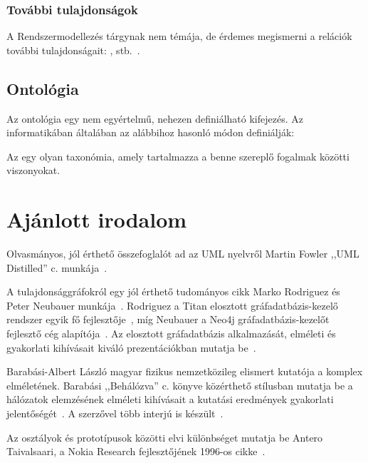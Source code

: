 \subsubsection{További tulajdonságok}

A Rendszermodellezés tárgynak nem témája, de érdemes megismerni a relációk további tulajdonságait: ,  stb.~\cite{relaciok}. 

\subsection{Ontológia}

Az ontológia egy nem egyértelmű, nehezen definiálható kifejezés. Az informatikában általában az alábbihoz hasonló módon definiálják:

\begin{definicio}
Az  egy olyan taxonómia, amely tartalmazza a benne szereplő fogalmak közötti viszonyokat. 
\end{definicio}


\section{Ajánlott irodalom}

Olvasmányos, jól érthető összefoglalót ad az UML nyelvről Martin Fowler ,,UML Distilled'' c. munkája~\cite{fowler1997uml}.

A tulajdonsággráfokról egy jól érthető tudományos cikk Marko Rodriguez és Peter Neubauer munkája~\cite{Rodriguez2010}. Rodriguez a Titan elosztott gráfadatbázis-kezelő rendszer egyik fő fejlesztője~\cite{Titan}, míg Neubauer a Neo4j gráfadatbázis-kezelőt fejlesztő cég alapítója~\cite{Neo4j}. Az elosztott gráfadatbázis alkalmazását, elméleti és gyakorlati kihívásait kiváló prezentációkban mutatja be~\cite{RodriguezSlides2012,RodriguezSlides2013}.

Barabási-Albert László magyar fizikus nemzetközileg elismert kutatója a komplex  elméletének. Barabási ,,Behálózva'' c. könyve közérthető stílusban mutatja be a hálózatok elemzésének elméleti kihívásait a kutatási eredmények gyakorlati jelentőségét~\cite{behalozva}. A szerzővel több interjú is készült~\cite{barabasi1,barabasi2,barabasi3}.

Az osztályok és prototípusok közötti elvi különbséget mutatja be Antero Taivalsaari, a Nokia Research fejlesztőjének 1996-os cikke~\cite{taivalsaari1996classes}.
